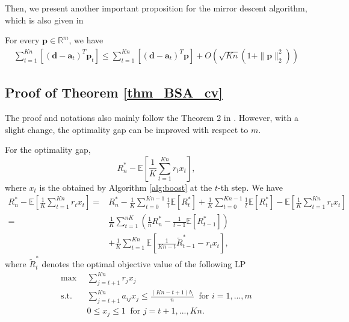 \documentclass{article} %
\begin{document}
\begin{APPENDICES}
        Then, we present another important proposition for the mirror descent algorithm, which is also given in \cite{balseiro2020dual}
        
        \begin{proposition}
        \label{mdw}
        For every $\bm{p}\in\mathbb{R}^m$, we have
            \begin{align*}
                \sum\limits_{t=1}^{Kn}\left[(\bm{d}-\bm{a}_t)^T\bm{p}_t\right]
                \leq
                \sum\limits_{t=1}^{Kn}\left[(\bm{d}-\bm{a}_t)^T\bm{p}\right]+O\left(\sqrt{Kn}(1+\|\bm{p}\|_2^2)\right)
            \end{align*}
        \end{proposition}
        
        \subsection{Proof of Theorem \ref{thm_BSA_cv}}
            The proof and notations also mainly follow the Theorem 2 in \cite{li2020simple}. However, with a slight change, the optimality gap can be improved with respect to $m$.
            
            
            For the optimality gap,
                $$
                    R_n^*-\mathbb{E}\left[\frac{1}{K}\sum\limits_{t=1}^{Kn}r_{t}x_{t}\right],
                $$
                where $x_{t}$ is the obtained by Algorithm \ref{alg:boost} at the $t$-th step. We have
                \begin{align}
                    R_n^*-\mathbb{E}\left[\frac{1}{K}\sum\limits_{t=1}^{Kn}r_{t}x_{t}\right]\nonumber
                    =&
                    R_n^*-
                    \frac{1}{K}\sum\limits_{t=0}^{Kn-1}\frac{1}{t}\mathbb{E}[R_{t}^*]
                    +
                    \frac{1}{K}\sum\limits_{t=0}^{Kn-1}\frac{1}{t}\mathbb{E}[R_{t}^*]
                    -\mathbb{E}\left[\frac{1}{K}\sum\limits_{t=1}^{Kn}r_{t}x_{t}\right]\nonumber
                    \\
                    =&
                    \frac{1}{K}\sum\limits_{t=1}^{nK}\left(\frac{1}{n}R_n^*-\frac{1}{t-1}\mathbb{E}[R_{t-1}^*]\right)\label{p1}\\
                    &+
                    \frac{1}{K}\sum\limits_{t=1}^{Kn}\mathbb{E}\left[\frac{1}{Kn-t}\tilde{R}_{t-1}^*-r_{t}x_{t}\label{p2}
                    \right],
                \end{align}
                where  $\tilde{R}_{t}^*$ denotes the optimal objective value of the following LP
                \begin{align*}
                      \max \ \ & \sum_{j=t+1}^{Kn} r_jx_{j}  \\
                        \text{s.t. }\ & \sum_{j=t+1}^{Kn} a_{ij}x_{j}\leq\frac{(Kn-t+1)b_i}{n} \ \text{ for } i=1,...,m\nonumber\\
                        & 0 \le x_{j} \le 1\ \text{ for } j=t+1,...,Kn.\nonumber
                \end{align*}
                

\end{APPENDICES}
\end{document}
